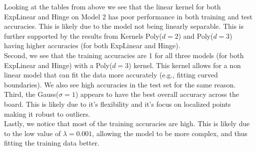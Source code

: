\documentclass[12pt]{article}
\begin{document}
\begin{enumerate}[(a)]
  Looking at the tables from above we see that the linear kernel for both ExpLinear and Hinge on Model 2 has poor performance in both training and test accuracies. This is likely due to the model not being linearly separable. This is further supported by the results from Kernels Poly($d=2$) and Poly($d = 3$) having higher accuracies (for both ExpLinear and Hinge).\\
  Second, we see that the training accuracies are 1 for all three models (for both ExpLinear and Hinge) with a Poly($d=3$) kernel. This kernel allows for a non linear model that can fit the data more accurately (e.g., fitting curved boundaries). We also see high accuracies in the test set for the same reason. \\
  Third, the Gauss($\sigma = 1$) appears to have the best overall accuracy across the board. This is likely due to it's flexibility and it's focus on localized points making it robust to outliers.\\
  Lastly, we notice that most of the training accuracies are high. This is likely due to the low value of $\lambda = 0.001$, allowing the model to be more complex, and thus fitting the training data better.

\end{enumerate}
\end{document}
